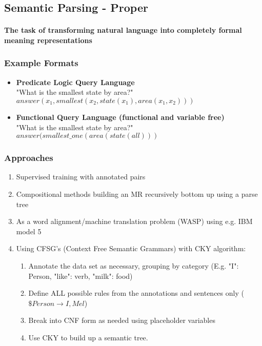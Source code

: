 \documentclass[]{article}
\begin{document}
\subsection{Semantic Parsing - Proper}
\paragraph{The task of transforming natural language into completely formal meaning representations}
\subsubsection{Example Formats}
\begin{itemize}
	\item \textbf{Predicate Logic Query Language}\\
	\textnormal "What is the smallest state by area?"\\
	\textnormal{$answer(x_1,smallest(x_2,state(x_1),area(x_1,x_2)))$}
	\item \textbf{Functional Query Language (functional and variable free)}\\
	\textnormal "What is the smallest state by area?"\\
	\textnormal{$answer(smallest\_one(area(state(all)))$}
\end{itemize}

\subsubsection{Approaches}

\begin{enumerate}
	\item Supervised training with annotated pairs
	\item Compositional methods building an MR recursively bottom up using a parse tree
	\item As a word alignment/machine translation problem (WASP) using e.g. IBM model 5
	\item Using CFSG's (Context Free Semantic Grammars) with CKY algorithm:
	\begin{enumerate}
		\item Annotate the data set as necessary, grouping by category (E.g. "I": Person, "like": verb, "milk": food)
		\item Define ALL possible rules from the annotations and sentences only ($\$Person \rightarrow I, Mel$)
		\item Break into CNF form as needed using placeholder variables
		\item Use CKY to build up a semantic tree.
	\end{enumerate}
	
\end{enumerate}
\end{document}
